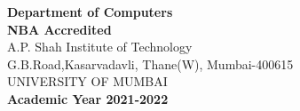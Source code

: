 \begin{titlepage}
{\hspace{.04cm}
\hspace{.04cm}

{\textbf {Department of Computers}}\\
\textbf{\textsf{NBA Accredited}}\\
A.P. Shah Institute of Technology\\
G.B.Road,Kasarvadavli, Thane(W), Mumbai-400615\\
UNIVERSITY OF MUMBAI\\
\vspace{0.2cm}
\textbf{Academic Year 2021-2022}\\
}
\end{titlepage}